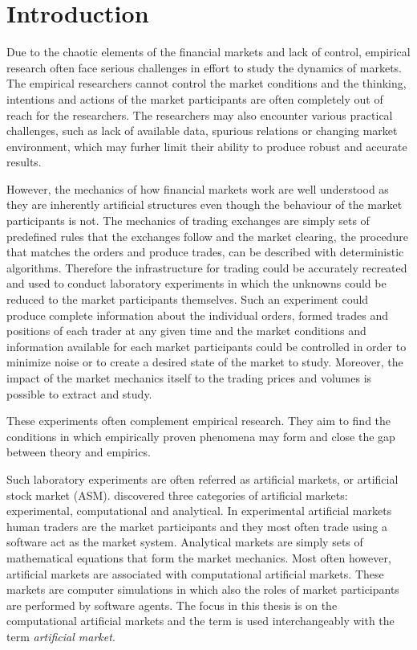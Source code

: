 \section{Introduction}

Due to the chaotic elements of the financial markets and lack of control, 
empirical research often face serious challenges in effort to study the 
dynamics of markets. The empirical researchers cannot control the market conditions 
and the thinking, intentions and actions of the market participants are often completely out of reach
for the researchers. The researchers may also encounter various practical challenges, such as 
lack of available data, spurious relations or changing market environment, 
which may furher limit their ability to produce robust and accurate results. 

However, the mechanics of how financial markets work are well 
understood as they are inherently artificial structures 
even though the behaviour of the market participants is not. 
The mechanics of trading exchanges are simply sets of predefined rules 
that the exchanges follow and the market clearing, the procedure 
that matches the orders and produce trades, can be described with 
deterministic algorithms. Therefore the infrastructure for trading
could be accurately recreated and used to conduct laboratory 
experiments in which the unknowns could be reduced to the market participants
themselves. Such an experiment could produce complete information about
the individual orders, formed trades and positions of each trader at any given time
and the market conditions and information available for each market participants could
be controlled in order to minimize noise or to create a desired state of the market to
study. Moreover, the impact of the market mechanics itself to the trading prices and volumes 
is possible to extract and study. 

These experiments often complement empirical research. They aim to find the
conditions in which empirically proven phenomena may form and close the gap
between theory and empirics. 

Such laboratory experiments are often referred as artificial markets, or artificial
stock market (ASM). \citet{boer05} discovered three categories of artificial markets: 
experimental, computational and analytical. In experimental artificial markets human traders
are the market participants and they most often trade using a software act as
the market system. Analytical markets are simply sets of mathematical equations that
form the market mechanics. Most often however, artificial markets are associated with 
computational artificial markets. These markets are computer simulations in which 
also the roles of market participants are performed by software agents. The focus in this
thesis is on the computational artificial markets and the term is used interchangeably
with the term \textit{artificial market}. 

